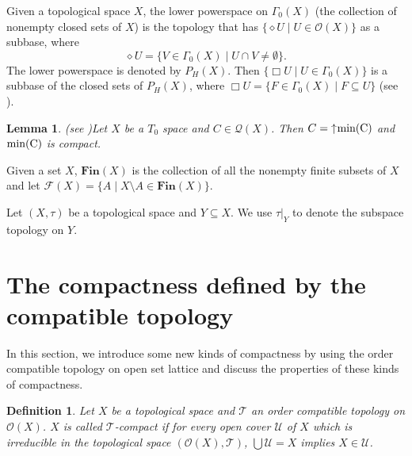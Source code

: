 \documentclass[preprint,12pt]{elsarticle}
\numberwithin{equation}{section}
\newtheorem{lemma}[theorem]{Lemma}
\newtheorem{definition}[theorem]{Definition}
\newcommand{\up}{\mathord{\uparrow}\hspace{0.05em}}
\begin{document}
\quad Given a topological space $X$, the lower powerspace on $\Gamma_{0}(X)$ (the collection of nonempty closed sets of $X$) is the topology that has $\{\diamond U\mid U\in\mathcal{O}(X)\}$ as a subbase, where $$\diamond U=\{V\in\Gamma_{0}(X)\mid U\cap V\neq\emptyset\}.$$ The lower powerspace is denoted by $P_{H}(X)$. Then $\{\Box U\mid U\in\Gamma_{0}(X)\}$ is a subbase of the closed sets of $P_{H}(X)$, where $\Box U=\{F\in\Gamma_{0}(X)\mid F\subseteq U\}$ (see \cite{ANVB75}).


\begin{lemma} (see \cite{AQ21})Let $X$ be a $T_{0}$ space and $C\in \mathcal{Q}(X)$. Then $C=\up {\rm min(C)}$ and ${\rm min(C)}$ is compact.
\end{lemma}

\quad Given a set $X$,  $\mathbf{Fin}(X)$ is the collection of all the nonempty finite subsets of $X$ and let $\mathscr{F}(X)=\{A\mid X\setminus A\in\mathbf{Fin}(X)\}$.

Let $(X,\tau)$ be a topological space and $Y\subseteq X$. We use $\tau|_{Y}$ to denote the subspace topology on $Y$.


\section{The compactness defined by the compatible topology }
\quad In this section, we introduce some new kinds of compactness by using the order compatible topology on open set lattice and discuss the properties of these kinds of compactness.




\begin{definition} Let $X$ be a topological space and $\mathcal{T}$ an order compatible topology on $\mathcal{O}(X)$. $X$ is called $\mathcal{T}$-compact if for every open cover $\mathcal{U}$ of $X$ which is irreducible in the topological space $(\mathcal{O}(X),\mathcal{T})$, $\bigcup\mathcal{U}=X$ implies $X\in\mathcal{U}$.
\end{definition}
\end{document}
